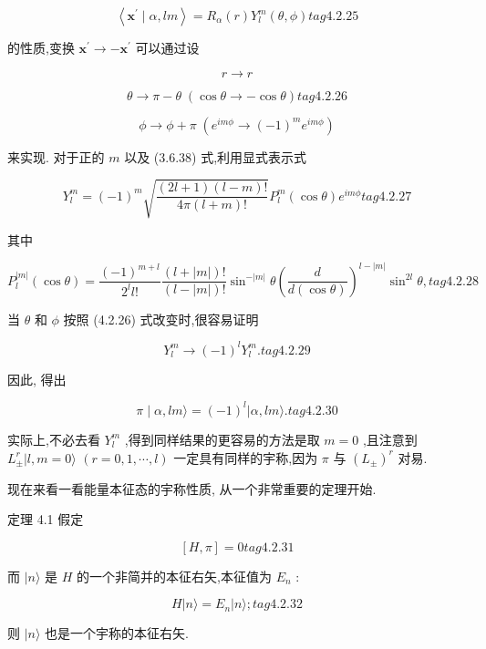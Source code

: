 $$
\left\langle {{\mathbf{x}}^{\prime } \mid \alpha ,{lm}}\right\rangle = {R}_{\alpha }\left( r\right) {Y}_{l}^{m}\left( {\theta ,\phi }\right) tag{4.2.25}
$$

的性质,变换 ${\mathbf{x}}^{\prime } \rightarrow - {\mathbf{x}}^{\prime }$ 可以通过设

$$
r \rightarrow r
$$

$$
\theta \rightarrow \pi - \theta \;\left( {\cos \theta \rightarrow - \cos \theta }\right) tag{4.2.26}
$$

$$
\phi \rightarrow \phi + \pi \;\left( {{e}^{im\phi } \rightarrow {\left( -1\right) }^{m}{e}^{im\phi }}\right)
$$

来实现. 对于正的 $m$ 以及 (3.6.38) 式,利用显式表示式

$$
{Y}_{l}^{m} = {\left( -1\right) }^{m}\sqrt{\frac{\left( {{2l} + 1}\right) \left( {l - m}\right) !}{{4\pi }\left( {l + m}\right) !}}{P}_{l}^{m}\left( {\cos \theta }\right) {e}^{im\phi } tag{4.2.27}
$$

其中

$$
{P}_{l}^{\left| m\right| }\left( {\cos \theta }\right) = \frac{{\left( -1\right) }^{m + l}}{{2}^{l}l!}\frac{\left( {l + \left| m\right| }\right) !}{\left( {l - \left| m\right| }\right) !}{\sin }^{-\left| m\right| }\theta {\left( \frac{d}{d\left( {\cos \theta }\right) }\right) }^{l - \left| m\right| }{\sin }^{2l}\theta , tag{4.2.28}
$$

当 $\theta$ 和 $\phi$ 按照 (4.2.26) 式改变时,很容易证明

$$
{Y}_{l}^{m} \rightarrow {\left( -1\right) }^{l}{Y}_{l}^{m}. tag{4.2.29}
$$

因此, 得出

$$
\pi \mid \alpha ,{lm}\rangle = {\left( -1\right) }^{l}|\alpha ,{lm}\rangle . tag{4. 2.30}
$$

实际上,不必去看 ${Y}_{l}^{m}$ ,得到同样结果的更容易的方法是取 $m = 0$ ,且注意到 ${L}_{ \pm }^{r}|l, m = 0\rangle$ $\left( {r = 0,1,\cdots, l}\right)$ 一定具有同样的宇称,因为 $\pi$ 与 ${\left( {L}_{ \pm }\right) }^{r}$ 对易.

现在来看一看能量本征态的宇称性质, 从一个非常重要的定理开始.

定理 4.1 假定

$$
\left\lbrack {H,\pi }\right\rbrack = 0 tag{4. 2.31}
$$

而 $|n\rangle$ 是 $H$ 的一个非简并的本征右矢,本征值为 ${E}_{n}$ :

$$
H\left| {n\rangle = {E}_{n}}\right| n\rangle ; tag{4. 2.32}
$$

则 $|n\rangle$ 也是一个宇称的本征右矢.

